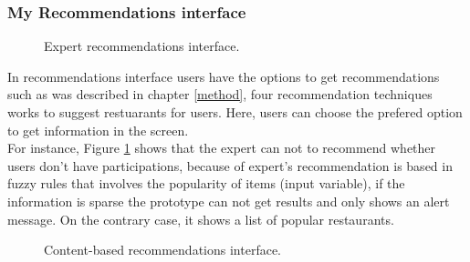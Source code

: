\subsubsection{My Recommendations interface}

\begin{figure}
\captionsetup{font=footnotesize}
\centering
{}
\caption{Expert recommendations interface.}
\label{fig:expert-recs}   
\end{figure}
In recommendations interface users have the options to get  
recommendations such as was described in chapter  \ref{method}, four 
recommendation techniques works to suggest restuarants for 
users. Here, users can choose the prefered option to get 
information in the screen.\\ 
For instance, Figure  \ref{fig:expert-recs} shows that the expert can 
not to recommend whether users don’t have participations, because of expert's
recommendation is based in fuzzy rules that involves the popularity of
items (input variable), if the information is sparse the prototype can
not get results and only shows an alert message. On the contrary case,
it shows a list of popular restaurants.
\begin{figure}
\captionsetup{font=footnotesize}
\centering
{}
\caption{Content-based recommendations interface.}
\label{fig:base-content}   
\end{figure}
